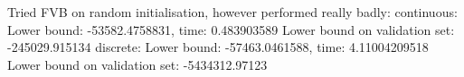 \documentclass[../report.tex]{subfiles}
\begin{document}
Tried FVB on random initialisation, however performed really badly:
continuous:
Lower bound: -53582.4758831, time: 0.483903589
Lower bound on validation set: -245029.915134
discrete:
Lower bound: -57463.0461588, time: 4.11004209518
Lower bound on validation set: -5434312.97123
\end{document}
